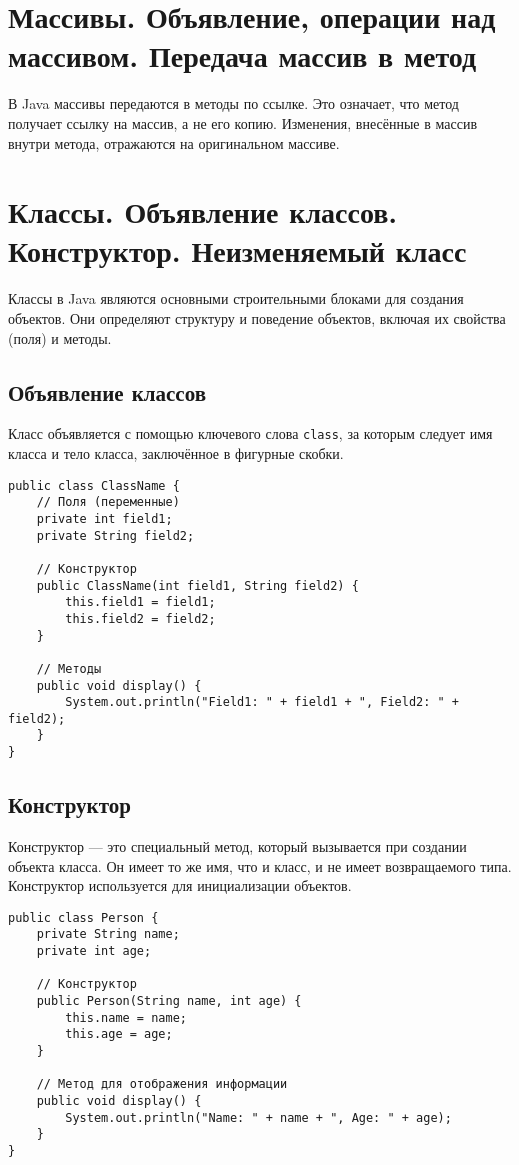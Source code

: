 \documentclass[12pt, a4paper]{article}
\begin{document}
\section{Массивы. Объявление, операции над массивом. Передача массив в метод}
В Java массивы передаются в методы по ссылке. Это означает, что метод получает ссылку на массив, а не его копию. Изменения, внесённые в массив внутри метода, отражаются на оригинальном массиве.


\section{Классы. Объявление классов. Конструктор. Неизменяемый класс}
Классы в Java являются основными строительными блоками для создания объектов. Они определяют структуру и поведение объектов, включая их свойства (поля) и методы.

\subsection*{Объявление классов}
Класс объявляется с помощью ключевого слова \texttt{class}, за которым следует имя класса и тело класса, заключённое в фигурные скобки.
\begin{verbatim}
public class ClassName {
    // Поля (переменные)
    private int field1;
    private String field2;

    // Конструктор
    public ClassName(int field1, String field2) {
        this.field1 = field1;
        this.field2 = field2;
    }

    // Методы
    public void display() {
        System.out.println("Field1: " + field1 + ", Field2: " + field2);
    }
}
\end{verbatim}

\subsection*{Конструктор}
Конструктор — это специальный метод, который вызывается при создании объекта класса. Он имеет то же имя, что и класс, и не имеет возвращаемого типа. Конструктор используется для инициализации объектов.
\begin{verbatim}
public class Person {
    private String name;
    private int age;

    // Конструктор
    public Person(String name, int age) {
        this.name = name;
        this.age = age;
    }

    // Метод для отображения информации
    public void display() {
        System.out.println("Name: " + name + ", Age: " + age);
    }
}
\end{verbatim}
\end{document}
